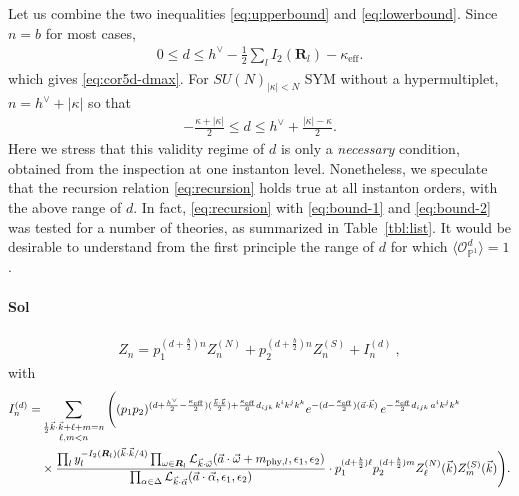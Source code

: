 \documentclass[letterpaper, 11pt]{article}
\newcommand{\nn}{\nonumber}
\def\IP{\mathbb{P}}
\def\CL{{\cal L}}
\def\a{\alpha}
\def\e{\epsilon}
\def\k{\kappa}
\def\w{\omega}
\def\D{\Delta}
\def\half{\frac{1}{2}}
\begin{document}
{Let us combine the two inequalities \eqref{eq:upperbound} and \eqref{eq:lowerbound}. Since $n=b$ for most cases, 
\begin{align}
  \label{eq:bound-1}
  \textstyle 0  \leq d  \leq h^\vee  - \frac{1}{2}  \sum_{l}I_2(\mathbf{R}_l) - \k_\text{eff} .
\end{align}
which gives \eqref{eq:cor5d-dmax}. For $SU(N)_{|\kappa|<N}$ SYM without a hypermultiplet, $n = h^\vee + |\k|$ so that \cite{Gottsche:2006bm}
\begin{align}
  \label{eq:bound-2}
  \textstyle -\frac{\k + |\k|}{2}  \leq d  \leq h^\vee + \frac{|\k|-\k}{2}.
\end{align}
Here we stress that this validity regime of $d$ is only a \emph{necessary} condition, obtained from the inspection at one instanton level. 
Nonetheless, we speculate that the recursion relation \eqref{eq:recursion}  holds true at all instanton orders, with the above range of $d$. In fact, \eqref{eq:recursion} with \eqref{eq:bound-1} and \eqref{eq:bound-2} was tested for a number of theories, as summarized in Table~\ref{tbl:list}. It would be desirable to understand from the first principle the range of $d$ for which $\langle \mathcal{O}_{\IP^1}^{d}\rangle = 1$.
}

\paragraph{Sol}
\begin{align}
 Z_n = p_1^{(d+\frac{b}{2})n}Z^{(N)}_{n}  + p_2^{(d+\frac{b}{2})n}  Z^{(S)}_n    + I_n^{(d)} \ , 
\end{align}
with 
\begin{align}
  I_n^{(d)} = &\sum_{\substack{\half \vec{k}\cdot\vec{k} + \ell + m = n \\ \ell, m < n}}  \Bigg( 
     (p_1p_2)^{(d+\frac{h^\vee}{2} - \frac{\kappa_\text{eff}}{2}) (\frac{\vec{k}\cdot\vec{k}}{2}) +\frac{\k_\text{eff}}{6}d_{ijk}\,k^ik^jk^k} e^{-(d-\frac{\k_\text{eff}}{2})(\vec{a}\cdot\vec{k})}\,
    e^{-\frac{\k_\text{eff}}{2}d_{ijk}\,a^ik^jk^k}  \\& 
  \times \frac{\prod_{l} y_l^{-I_2(\boldsymbol{R}_l)(\vec{k}\cdot\vec{k}/4)} \prod_{\w \in \boldsymbol{R}_l} \CL_{\vec{k}\cdot\vec{\w}}(\vec{a}\cdot \vec{\w} + m_{\text{phy},l}, \e_1,\e_2)}{ \prod_{\a \in \D} \CL_{\vec{k} \cdot \vec{\a}} (\vec{a}\cdot\vec{\alpha}, \epsilon_1, \epsilon_2)}
  \cdot p_1^{(d+\frac{b}{2})\ell}p_2^{(d+\frac{b}{2})m}Z^{(N)}_{\ell}(\vec{k})  Z^{(S)}_m (\vec{k}) \Bigg). \nn
\end{align}
  
\end{document}

